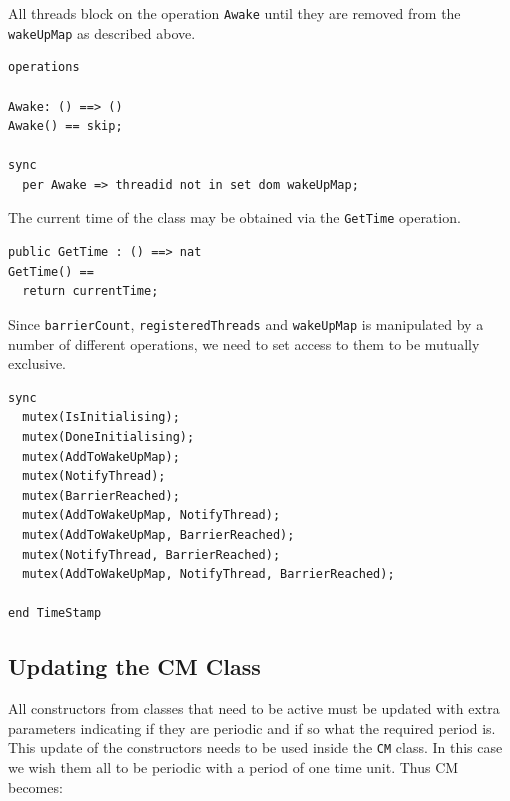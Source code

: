 \documentclass{overturerepchap}
\begin{document}
All threads block on the operation \texttt{Awake} until they are removed from
the \texttt{wakeUpMap} as described above.

\begin{lstlisting}
operations

Awake: () ==> ()
Awake() == skip;

sync
  per Awake => threadid not in set dom wakeUpMap;
\end{lstlisting}

The current time of the class may be obtained via the \texttt{GetTime}
operation.

\begin{lstlisting}
public GetTime : () ==> nat
GetTime() ==
  return currentTime;
\end{lstlisting}

Since \texttt{barrierCount}, \texttt{registeredThreads} and 
\texttt{wakeUpMap} is manipulated by a number of different
operations, we need to set access to them to be mutually exclusive.

\begin{lstlisting}
sync
  mutex(IsInitialising);
  mutex(DoneInitialising);
  mutex(AddToWakeUpMap);
  mutex(NotifyThread);
  mutex(BarrierReached);
  mutex(AddToWakeUpMap, NotifyThread);
  mutex(AddToWakeUpMap, BarrierReached);
  mutex(NotifyThread, BarrierReached);
  mutex(AddToWakeUpMap, NotifyThread, BarrierReached);

end TimeStamp
\end{lstlisting}

\subsection{Updating the CM Class}

All constructors from classes that need to be active must be updated
with extra parameters indicating if they are periodic and if so what
the required period is. This update of the constructors needs to be
used inside the \texttt{CM} class. In this case we wish them all to 
be periodic with a period of one time unit. Thus CM becomes:
\end{document}
